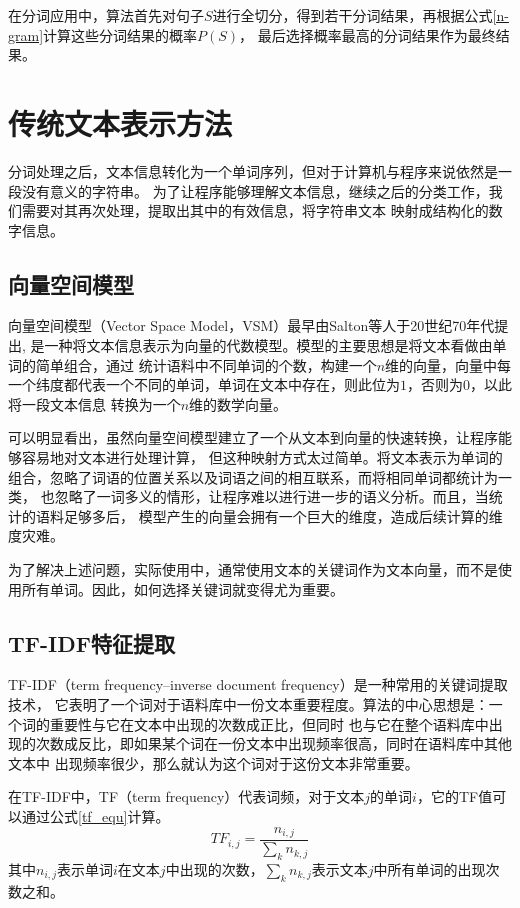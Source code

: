 在分词应用中，算法首先对句子$S$进行全切分，得到若干分词结果，再根据公式\ref{n-gram}计算这些分词结果的概率$P\left ( S \right )$，
最后选择概率最高的分词结果作为最终结果。

\section{传统文本表示方法}
分词处理之后，文本信息转化为一个单词序列，但对于计算机与程序来说依然是一段没有意义的字符串。
为了让程序能够理解文本信息，继续之后的分类工作，我们需要对其再次处理，提取出其中的有效信息，将字符串文本
映射成结构化的数字信息。

\subsection{向量空间模型}

向量空间模型（Vector Space Model，VSM）最早由Salton等人于20世纪70年代提出,
是一种将文本信息表示为向量的代数模型。模型的主要思想是将文本看做由单词的简单组合，通过
统计语料中不同单词的个数，构建一个$n$维的向量，向量中每一个纬度都代表一个不同的单词，单词在文本中存在，则此位为$1$，否则为$0$，以此将一段文本信息
转换为一个$n$维的数学向量。

可以明显看出，虽然向量空间模型建立了一个从文本到向量的快速转换，让程序能够容易地对文本进行处理计算，
但这种映射方式太过简单。将文本表示为单词的组合，忽略了词语的位置关系以及词语之间的相互联系，而将相同单词都统计为一类，
也忽略了一词多义的情形，让程序难以进行进一步的语义分析。而且，当统计的语料足够多后，
模型产生的向量会拥有一个巨大的维度，造成后续计算的维度灾难。

为了解决上述问题，实际使用中，通常使用文本的关键词作为文本向量，而不是使用所有单词。因此，如何选择关键词就变得尤为重要。

\subsection{TF-IDF特征提取}

TF-IDF（term frequency–inverse document frequency）是一种常用的关键词提取技术，
它表明了一个词对于语料库中一份文本重要程度。算法的中心思想是：一个词的重要性与它在文本中出现的次数成正比，但同时
也与它在整个语料库中出现的次数成反比，即如果某个词在一份文本中出现频率很高，同时在语料库中其他文本中
出现频率很少，那么就认为这个词对于这份文本非常重要。

在TF-IDF中，TF（term frequency）代表词频，对于文本$j$的单词$i$，它的TF值可以通过公式\ref{tf_equ}计算。
\begin{equation}
    TF_{i,j}=\frac{n_{i,j}}{\sum_k n_{k,j}}
    \label{tf_equ}
\end{equation}
其中$n_{i,j}$表示单词$i$在文本$j$中出现的次数，$\sum_k n_{k,j}$表示文本$j$中所有单词的出现次数之和。

